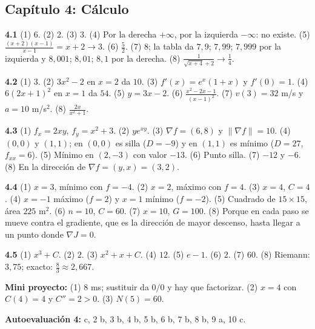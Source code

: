 \subsection*{Cap\'itulo 4: C\'alculo}
\textbf{4.1}\label{resp:4-1}\quad
(1) 6. (2) 2. (3) 3. (4) Por la derecha $+\infty$, por la izquierda $-\infty$: no existe. (5) $\frac{(x+2)(x-1)}{x-1}=x+2\to3$. (6) $\frac52$. (7) 8; la tabla da $7{,}9$; $7{,}99$; $7{,}999$ por la izquierda y $8{,}001$; $8{,}01$; $8{,}1$ por la derecha. (8) $\frac{1}{\sqrt{x+4}+2}\to\frac14$.

\medskip\noindent\textbf{4.2}\label{resp:4-2}\quad
(1) $3$. (2) $3x^2-2$ en $x=2$ da $10$. (3) $f'(x)=e^x(1+x)$ y $f'(0)=1$. (4) $6(2x+1)^2$ en $x=1$ da $54$. (5) $y=3x-2$. (6) $\frac{x^2-2x-1}{(x-1)^2}$. (7) $v(3)=32$ m/s y $a=10$ m/s$^2$. (8) $\frac{2x}{x^2+1}$.

\medskip\noindent\textbf{4.3}\label{resp:4-3}\quad
(1) $f_x=2xy$, $f_y=x^2+3$. (2) $ye^{xy}$. (3) $\nabla f=(6, 8)$ y $\|\nabla f\|=10$. (4) $(0, 0)$ y $(1, 1)$; en $(0, 0)$ es silla ($D=-9$) y en $(1, 1)$ es m\'inimo ($D=27$, $f_{xx}=6$). (5) M\'inimo en $(2,-3)$ con valor $-13$. (6) Punto silla. (7) $-12$ y $-6$. (8) En la direcci\'on de $\nabla f=(y, x)=(3, 2)$.

\medskip\noindent\textbf{4.4}\label{resp:4-4}\quad
(1) $x=3$, m\'inimo con $f=-4$. (2) $x=2$, m\'aximo con $f=4$. (3) $x=4$, $C=4$. (4) $x=-1$ m\'aximo ($f=2$) y $x=1$ m\'inimo ($f=-2$). (5) Cuadrado de $15\times15$, \'area $225$ m$^2$. (6) $n=10$, $C=60$. (7) $x=10$, $G=100$. (8) Porque en cada paso se mueve contra el gradiente, que es la direcci\'on de mayor descenso, hasta llegar a un punto donde $\nabla J=0$.

\medskip\noindent\textbf{4.5}\label{resp:4-5}\quad
(1) $x^3+C$. (2) $2$. (3) $x^2+x+C$. (4) $12$. (5) $e-1$. (6) $2$. (7) $60$. (8) Riemann: $3{,}75$; exacto: $\frac83\approx2{,}667$.

\medskip\noindent\textbf{Mini proyecto:} (1) $8$ ms; sustituir da $0/0$ y hay que factorizar. (2) $x=4$ con $C(4)=4$ y $C''=2>0$. (3) $N(5)=60$.

\medskip\noindent\textbf{Autoevaluaci\'on 4:}\label{resp:q4} c, 2 b, 3 b, 4 b, 5 b, 6 b, 7 b, 8 b, 9 a, 10 c.
